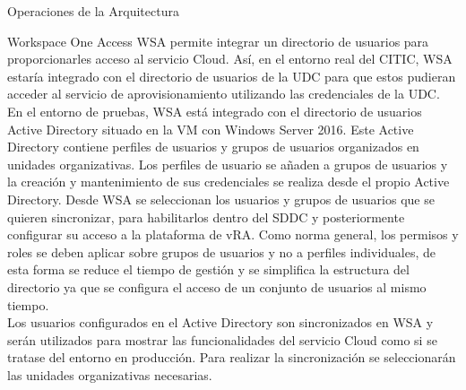 \begin{subsection}{Operaciones de la Arquitectura}
    \begin{subsubsection}{Workspace One Access}
        \label{subsubsec:WSA}
        WSA permite integrar un directorio de usuarios para proporcionarles acceso al servicio Cloud. Así, en el entorno real del CITIC, WSA estaría integrado con el directorio de usuarios de la UDC para que estos pudieran acceder al servicio de aprovisionamiento utilizando las credenciales de la UDC.\\
        En el entorno de pruebas, WSA está integrado con el directorio de usuarios Active Directory situado en la VM con Windows Server 2016. Este Active Directory contiene perfiles de usuarios y grupos de usuarios organizados en unidades organizativas. Los perfiles de usuario se añaden a grupos de usuarios y la creación y mantenimiento de sus credenciales se realiza desde el propio Active Directory. Desde WSA se seleccionan los usuarios y grupos de usuarios que se quieren sincronizar, para habilitarlos dentro del SDDC y posteriormente configurar su acceso a la plataforma de vRA. Como norma general, los permisos y roles se deben aplicar sobre grupos de usuarios y no a perfiles individuales, de esta forma se reduce el tiempo de gestión y se simplifica la estructura del directorio ya que se configura el acceso de un conjunto de usuarios al mismo tiempo.\\
        Los usuarios configurados en el Active Directory son sincronizados en WSA y serán utilizados para mostrar las funcionalidades del servicio Cloud como si se tratase del entorno en producción. Para realizar la sincronización se seleccionarán las unidades organizativas necesarias.
        

\end{subsubsection}
\end{subsection}
